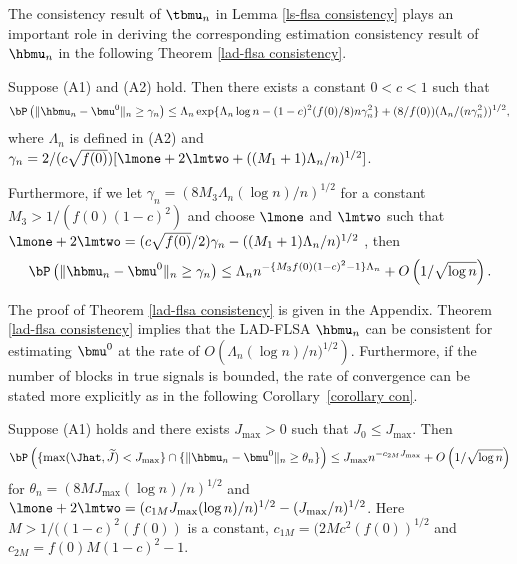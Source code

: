 \documentclass[12pt]{article}
\begin{document}
The consistency result of $\tbmu_n$ in Lemma  \ref{ls-flsa consistency} plays an important role in deriving the corresponding
estimation consistency result  of $\hbmu_n$  in the following Theorem \ref{lad-flsa consistency}.
\begin{theorem}\label{lad-flsa consistency}
Suppose (A1) and (A2) hold. Then
there exists a constant $0<c<1$   such that
 $$\bP\left(\|\hbmu_n-\bmu^0\|_n \ge \gamma_n \right)
 \le  \Lambda_n \exp\{ \Lambda_n\log n -(1-c)^2(f(0)/8) n\gamma_n^2\}
                     +(8/f(0))(\Lambda_n/(n\gamma_n^2))^{1/2},$$
 where
 $\Lambda_n$ is defined in (A2) and
 $\gamma_n=2/(c\sqrt{f(0)}) [\lmone+2\lmtwo +((M_1+1)\Lambda_n/n)^{1/2}]$.


Furthermore, if we let $\gamma_n=(8M_3 \Lambda_n (\log n)/n)^{1/2}$
for a constant $M_3>1/(f(0)(1-c)^2)$
and choose $\lmone$ and $\lmtwo$ such that
$\lmone+2\lmtwo=(c\sqrt{f(0)}/2)\gamma_n-((M_1+1)\Lambda_n/n)^{1/2}$
, then
$$ \bP\left(\|\hbmu_n-\bmu^0\|_n \ge \gamma_n\right)
\le \Lambda_n n^{-\{M_3f(0)(1-c)^2-1\} \Lambda_n}+O\left(1/\sqrt{\log n}\right).$$
 \end{theorem}
The proof of Theorem \ref{lad-flsa consistency}
is given in the Appendix.
Theorem \ref{lad-flsa consistency} implies that
 the LAD-FLSA  $\hbmu_n$ can be consistent for estimating $\bmu^0$ at
the rate of $O\left(\Lambda_n (\log n)/ n)^{1/2}\right)$.
Furthermore, if the number of blocks in true signals is bounded,
 the  rate of convergence can be stated more explicitly
as in the following
 Corollary~\ref{corollary con}.
   \begin{corollary}\label{corollary con}
   Suppose (A1) holds and there exists $J_{\max}>0$ such that $J_0 \le J_{\max}$.
  Then
   $$ \bP\left( \{\max(\Jhat,\widetilde J)<J_{\max}\}
                \cap
                 \{\|\hbmu_n-\bmu^0\|_n \ge \theta_n\} \right)
\le J_{\max} n^{-c_{2M} J_{\max}}+O\left(1/\sqrt{\log n}\right)$$
for $\theta_n=(8M J_{\max} (\log n)/n)^{1/2}$ and
  $\lmone+2\lmtwo=(c_{1M} J_{\max} (\log n)/n)^{1/2}-(J_{\max}/n)^{1/2}$.
Here  $M>1/((1-c)^2(f(0))$ is a constant,   $c_{1M}=(2Mc^2(f(0))^{1/2}$
  and $c_{2M}=f(0)M(1-c)^2-1$.
      \end{corollary}
\end{document}
